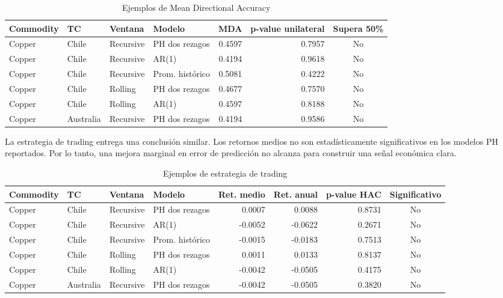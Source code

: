 \documentclass[11pt,letterpaper]{article}
\begin{document}
\begin{table}[H]
\centering
\caption{Ejemplos de Mean Directional Accuracy}
\scriptsize
\begin{tabular}{llllrrc}
\toprule
Commodity & TC & Ventana & Modelo & MDA & p-value unilateral & Supera 50\% \\
\midrule
Copper & Chile & Recursive & PH dos rezagos & 0.4597 & 0.7957 & No \\
Copper & Chile & Recursive & AR(1) & 0.4194 & 0.9618 & No \\
Copper & Chile & Recursive & Prom. histórico & 0.5081 & 0.4222 & No \\
Copper & Chile & Rolling & PH dos rezagos & 0.4677 & 0.7570 & No \\
Copper & Chile & Rolling & AR(1) & 0.4597 & 0.8188 & No \\
Copper & Australia & Recursive & PH dos rezagos & 0.4194 & 0.9586 & No \\
\bottomrule
\end{tabular}
\end{table}

La estrategia de trading entrega una conclusión similar. Los retornos medios no son estadísticamente significativos en los modelos PH reportados. Por lo tanto, una mejora marginal en error de predicción no alcanza para construir una señal económica clara.

\begin{table}[H]
\centering
\caption{Ejemplos de estrategia de trading}
\scriptsize
\begin{tabular}{llllrrrc}
\toprule
Commodity & TC & Ventana & Modelo & Ret. medio & Ret. anual & p-value HAC & Significativo \\
\midrule
Copper & Chile & Recursive & PH dos rezagos & 0.0007 & 0.0088 & 0.8731 & No \\
Copper & Chile & Recursive & AR(1) & -0.0052 & -0.0622 & 0.2671 & No \\
Copper & Chile & Recursive & Prom. histórico & -0.0015 & -0.0183 & 0.7513 & No \\
Copper & Chile & Rolling & PH dos rezagos & 0.0011 & 0.0133 & 0.8137 & No \\
Copper & Chile & Rolling & AR(1) & -0.0042 & -0.0505 & 0.4175 & No \\
Copper & Australia & Recursive & PH dos rezagos & -0.0042 & -0.0505 & 0.3820 & No \\
\bottomrule
\end{tabular}
\end{table}
\end{document}
